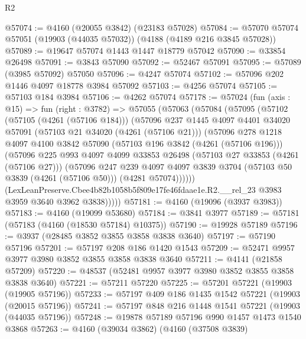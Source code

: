 \begin{lexlean}{R2}
\begin{coremodule}
@57074 := @4160 (@20055 @3842) (@23183 @57028)
@57084 := @57070 @57074 @57051 (@19903 (@44035 @57032)) (@4188 (@4189 @216 @3845 @57028))
@57089 := @19647 @57074 @1443 @1447 @18779 @57042
@57090 := @33854 @26498
@57091 := @3843 @57090
@57092 := @52467 @57091
@57095 := @57089 (@3985 @57092) @57050
@57096 := @4247 @57074
@57102 := @57096 @202 @1446 @4097 @18778 @3984 @57092
@57103 := @4256 @57074
@57105 := @57103 @184 @3984
@57106 := @4262 @57074
@57178 := @57024
    (fun (axis : @15) =>
    fun (right : @3782) =>
    @57055
      (@57063
        (@57084
          (@57095
            (@57102
              (@57105 (@4261 (@57106 @184)))
              (@57096
                @237
                @1445
                @4097
                @4401
                @34020
                @57091
                (@57103 @21 @34020 (@4261 (@57106 @21)))
                (@57096
                  @278
                  @1218
                  @4097
                  @4100
                  @3842
                  @57090
                  (@57103 @196 @3842 (@4261 (@57106 @196)))
                  (@57096
                    @225
                    @993
                    @4097
                    @4099
                    @33853
                    @26498
                    (@57103 @27 @33853 (@4261 (@57106 @27)))
                    (@57096
                      @247
                      @239
                      @4097
                      @4097
                      @3839
                      @3704
                      (@57103 @50 @3839 (@4261 (@57106 @50)))
                      (@4281 @57074))))))
            (LexLeanPreserve.Cbee4b82b1058b5f809e17fe46fdaae1e.R2.__rel_23
              @3983
              @3959
              @3640
              @3962
              @3838)))))
@57181 := @4160 (@19096 (@3937 @3983))
@57183 := @4160 (@19099 @53680)
@57184 := @3841 @3977
@57189 := @57181 (@57183 (@4160 (@18530 @57184) @10375))
@57190 := @19928 @57189
@57196 := @3937 (@28485 @3852 @3855 @3858 @3838 @3640)
@57197 := @57190 @57196
@57201 := @57197 @208 @186 @1420 @1543
@57209 := @52471 @9957 @3977 @3980 @3852 @3855 @3858 @3838 @3640
@57211 := @4141 (@21858 @57209)
@57220 := @48537 (@52481 @9957 @3977 @3980 @3852 @3855 @3858 @3838 @3640)
@57221 := @57211 @57220
@57225 := @57201 @57221 (@19903 (@19905 @57196))
@57233 := @57197 @409 @186 @1435 @1542 @57221 (@19903 (@20015 @57196))
@57241 := @57197 @848 @216 @1448 @1541 @57221 (@19903 (@44035 @57196))
@57248 := @19878 @57189 @57196 @990 @1457 @1473 @1540 @3868
@57263 := @4160
    (@39034 @3862)
    (@4160
      (@37508 @3839)

\end{coremodule}
\end{lexlean}
